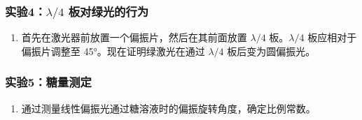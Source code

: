 \documentclass{ctexart}
\begin{document}
\subsubsection{实验4：$\lambda/4$ 板对绿光的行为}
\begin{enumerate}
    \item 首先在激光器前放置一个偏振片，然后在其前面放置 $\lambda/4$ 板。$\lambda/4$ 板应相对于偏振片调整至 45°。现在证明绿激光在通过 $\lambda/4$ 板后变为圆偏振光。
\end{enumerate}

\subsubsection{实验5：糖量测定}
\begin{enumerate}
    \item 通过测量线性偏振光通过糖溶液时的偏振旋转角度，确定比例常数。
\end{enumerate}
\end{document}
